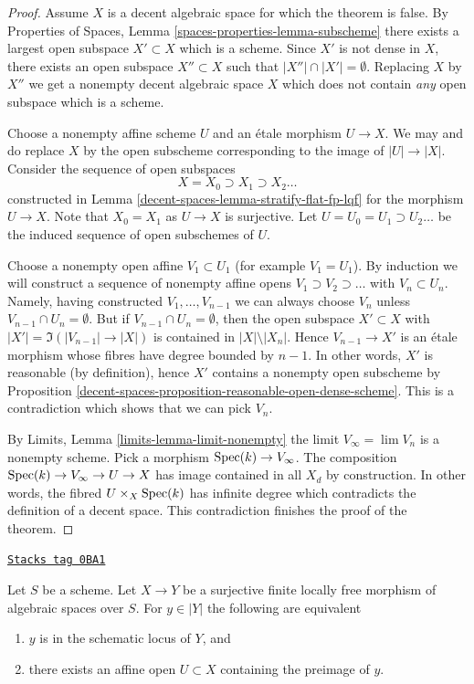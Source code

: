 \begin{proof}
Assume $X$ is a decent algebraic space for which the theorem is false. By
Properties of Spaces, Lemma \ref{spaces-properties-lemma-subscheme}
there exists a largest open subspace $X' \subset X$ which is a scheme.
Since $X'$ is not dense in $X$, there exists an open subspace
$X'' \subset X$ such that $|X''| \cap |X'| = \emptyset$. Replacing $X$
by $X''$ we get a nonempty decent algebraic space $X$ which does not
contain {\it any} open subspace which is a scheme.

\medskip\noindent
Choose a nonempty affine scheme $U$ and an \'etale morphism $U \to X$.
We may and do replace $X$ by the open subscheme corresponding to the
image of $|U| \to |X|$. Consider the sequence of open subspaces
$$
X = X_0 \supset X_1 \supset X_2 \ldots
$$
constructed in Lemma \ref{decent-spaces-lemma-stratify-flat-fp-lqf}
for the morphism $U \to X$. Note that $X_0 = X_1$ as $U \to X$
is surjective. Let $U = U_0 = U_1 \supset U_2 \ldots$ be the induced
sequence of open subschemes of $U$.

\medskip\noindent
Choose a nonempty open affine $V_1 \subset U_1$ (for example $V_1 = U_1$).
By induction we will construct a sequence of nonempty affine opens
$V_1 \supset V_2 \supset \ldots$ with $V_n \subset U_n$. Namely, having
constructed $V_1, \ldots, V_{n - 1}$ we can always choose $V_n$ unless
$V_{n - 1} \cap U_n = \emptyset$. But if $V_{n - 1} \cap U_n = \emptyset$,
then the open subspace $X' \subset X$ with
$|X'| = \Im(|V_{n - 1}| \to |X|)$ is contained in $|X| \setminus |X_n|$.
Hence $V_{n - 1} \to X'$ is an \'etale morphism whose fibres have degree
bounded by $n - 1$. In other words, $X'$ is reasonable (by definition),
hence $X'$ contains a nonempty open subscheme by
Proposition \ref{decent-spaces-proposition-reasonable-open-dense-scheme}.
This is a contradiction which shows that we can pick $V_n$.

\medskip\noindent
By Limits, Lemma \ref{limits-lemma-limit-nonempty}
the limit $V_\infty = \lim V_n$ is a nonempty scheme. Pick a morphism
$\operatorname{Spec}(k) \to V_\infty$. The composition $\operatorname{Spec}(k) \to V_\infty \to U \to X$
has image contained in all $X_d$ by construction. In other words, the
fibred $U \times_X \operatorname{Spec}(k)$ has infinite degree which contradicts
the definition of a decent space. This contradiction finishes the proof
of the theorem.
\end{proof}

\begin{lemma}
\label{decent-spaces-lemma-when-quotient-scheme-at-point}
\href{https://stacks.math.columbia.edu/tag/0BA1}{\texttt{Stacks tag 0BA1}}

Let $S$ be a scheme. Let $X \to Y$ be a surjective finite locally free
morphism of algebraic spaces over $S$. For $y \in |Y|$ the following are
equivalent
\begin{enumerate}
\item $y$ is in the schematic locus of $Y$, and
\item there exists an affine open $U \subset X$
containing the preimage of $y$.
\end{enumerate}
\end{lemma}

